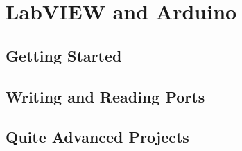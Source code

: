 \chapter{LabVIEW and Arduino}
\section{Getting Started}

\section{Writing and Reading Ports}

\section{Quite Advanced Projects}